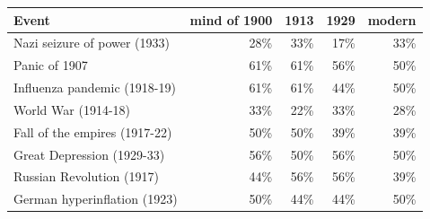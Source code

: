 \begin{tabular}{lrrrr}
\toprule
Event & mind of 1900 & 1913 & 1929 & modern \\
\midrule
Nazi seizure of power (1933) & 28\% & 33\% & 17\% & 33\% \\
Panic of 1907 & 61\% & 61\% & 56\% & 50\% \\
Influenza pandemic (1918-19) & 61\% & 61\% & 44\% & 50\% \\
World War (1914-18) & 33\% & 22\% & 33\% & 28\% \\
Fall of the empires (1917-22) & 50\% & 50\% & 39\% & 39\% \\
Great Depression (1929-33) & 56\% & 50\% & 56\% & 50\% \\
Russian Revolution (1917) & 44\% & 56\% & 56\% & 39\% \\
German hyperinflation (1923) & 50\% & 44\% & 44\% & 50\% \\
\bottomrule
\end{tabular}
